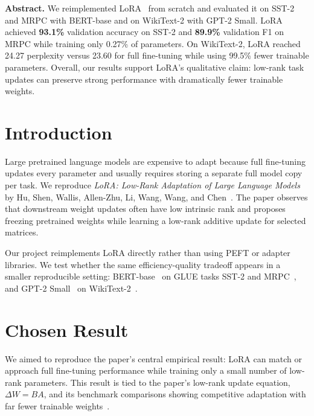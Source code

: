 \documentclass[11pt,twocolumn]{article}
\begin{document}

\noindent\textbf{Abstract.}
We reimplemented LoRA~\cite{hu2022lora} from scratch and evaluated it on SST-2 and MRPC with BERT-base and on WikiText-2 with GPT-2 Small. LoRA achieved \textbf{93.1\%} validation accuracy on SST-2 and \textbf{89.9\%} validation F1 on MRPC while training only 0.27\% of parameters. On WikiText-2, LoRA reached 24.27 perplexity versus 23.60 for full fine-tuning while using 99.5\% fewer trainable parameters. Overall, our results support LoRA's qualitative claim: low-rank task updates can preserve strong performance with dramatically fewer trainable weights.

\section{Introduction}
Large pretrained language models are expensive to adapt because full fine-tuning updates every parameter and usually requires storing a separate full model copy per task. We reproduce \emph{LoRA: Low-Rank Adaptation of Large Language Models} by Hu, Shen, Wallis, Allen-Zhu, Li, Wang, Wang, and Chen~\cite{hu2022lora}. The paper observes that downstream weight updates often have low intrinsic rank and proposes freezing pretrained weights while learning a low-rank additive update for selected matrices.

Our project reimplements LoRA directly rather than using PEFT or adapter libraries. We test whether the same efficiency-quality tradeoff appears in a smaller reproducible setting: BERT-base~\cite{devlin2019bert} on GLUE tasks SST-2 and MRPC~\cite{wang2019glue,socher2013sst,dolan2005mrpc}, and GPT-2 Small~\cite{radford2019language} on WikiText-2~\cite{merity2017wikitext}.

\section{Chosen Result}
We aimed to reproduce the paper's central empirical result: LoRA can match or approach full fine-tuning performance while training only a small number of low-rank parameters. This result is tied to the paper's low-rank update equation, $\Delta W=BA$, and its benchmark comparisons showing competitive adaptation with far fewer trainable weights~\cite{hu2022lora}.
\end{document}
